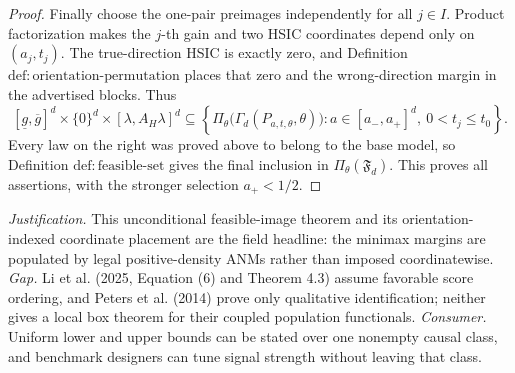 \documentclass{article}
\begin{document}
\begin{proof}
Finally choose the one-pair preimages independently for all \(j\in I\).  Product factorization makes the \(j\)-th gain and two HSIC coordinates depend only on \((a_j,t_j)\).  The true-direction HSIC is exactly zero, and Definition \(\mathrm{def:orientation\text{-}permutation}\) places that zero and the wrong-direction margin in the advertised blocks.  Thus
\[
[\underline g,\overline g]^d\times\{0\}^d\times[\lambda,A_H\lambda]^d
\subseteq
\left\{\Pi_\theta\bigl(\Gamma_d(P_{a,t,\theta},\theta)\bigr):
a\in[a_-,a_+]^d,\ 0<t_j\le t_0\right\}.
\]
Every law on the right was proved above to belong to the base model, so Definition \(\mathrm{def:feasible\text{-}set}\) gives the final inclusion in \(\Pi_\theta(\mathfrak F_d)\).  This proves all assertions, with the stronger selection \(a_+<1/2\).
\end{proof}
\par\smallskip\noindent \textit{Justification.} This unconditional feasible-image theorem and its orientation-indexed coordinate placement are the field headline: the minimax margins are populated by legal positive-density ANMs rather than imposed coordinatewise. \textit{Gap.} Li et al. (2025, Equation (6) and Theorem 4.3) assume favorable score ordering, and Peters et al. (2014) prove only qualitative identification; neither gives a local box theorem for their coupled population functionals. \textit{Consumer.} Uniform lower and upper bounds can be stated over one nonempty causal class, and benchmark designers can tune signal strength without leaving that class.
\end{document}
